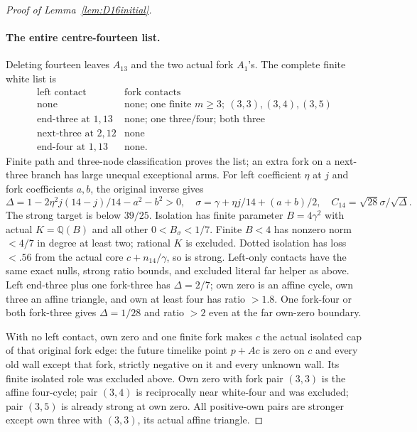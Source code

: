 \documentclass[11pt]{article}
\begin{document}
\begin{proof}[Proof of Lemma~\ref{lem:D16initial}]
\paragraph{The entire centre-fourteen list.}
Deleting fourteen leaves $A_{13}$ and the two actual fork $A_1$'s.
The complete finite white list is
\[
\begin{array}{c|l}
\text{left contact}&\text{fork contacts}\\\hline
\text{none}&\text{none; one finite }m\ge3;\ (3,3),(3,4),(3,5)\\
\text{end-three at }1,13&\text{none; one three/four; both three}\\
\text{next-three at }2,12&\text{none}\\
\text{end-four at }1,13&\text{none}.
\end{array}
\]
Finite path and three-node classification proves the list; an extra
fork on a next-three branch has large unequal exceptional arms.
For left coefficient $\eta$ at $j$ and fork coefficients $a,b$,
the original inverse gives
\[
\Delta=1-2\eta^2j(14-j)/14-a^2-b^2>0,\quad
\sigma=\gamma+\eta j/14+(a+b)/2,\quad
C_{14}=\sqrt{28}\sigma/\sqrt\Delta .
\]
The strong target is below $39/25$.
Isolation has finite parameter $B=4\gamma^2$ with actual
$K=\mathbb Q(B)$ and all other $0<B_\sigma<1/7$.
Finite $B<4$ has nonzero norm $<4/7$ in degree at least two;
rational $K$ is excluded. Dotted isolation has loss $<.56$
from the actual core $c+n_{14}/\gamma$, so is strong.
Left-only contacts have the same exact nulls, strong ratio bounds,
and excluded literal far helper as above.
Left end-three plus one fork-three has $\Delta=2/7$;
own zero is an affine cycle, own three an affine triangle, and
own at least four has ratio $>1.8$.
One fork-four or both fork-three gives $\Delta=1/28$ and ratio
$>2$ even at the far own-zero boundary.

With no left contact, own zero and one finite fork makes $c$
the actual isolated cap of that original fork edge:
the future timelike point $p+Ac$ is zero on $c$ and every old
wall except that fork, strictly negative on it and every unknown
wall. Its finite isolated role was excluded above.
Own zero with fork pair $(3,3)$ is the affine four-cycle;
pair $(3,4)$ is reciprocally near white-four and was excluded;
pair $(3,5)$ is already strong at own zero.
All positive-own pairs are stronger except own three with
$(3,3)$, its actual affine triangle.


\end{proof}
\end{document}
